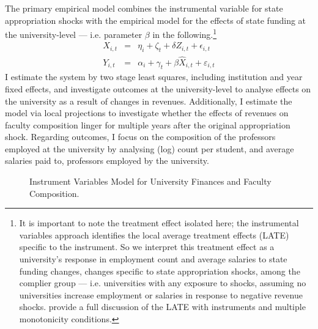 The primary empirical model combines the instrumental variable for state appropriation shocks with the empirical model for the effects of state funding at the university-level --- i.e. parameter $\beta$ in the following.\footnote{
    It is important to note the treatment effect isolated here; the instrumental variables approach identifies the local average treatment effects (LATE) specific to the instrument.
    So we interpret this treatment effect as a university's response in employment count and average salaries to state funding changes, changes specific to state appropriation shocks, among the complier group --- i.e. universities with any exposure to shocks, assuming no universities increase employment or salaries in response to negative revenue shocks.
    \cite{mogstad2021causal} provide a full discussion of the LATE with instruments and multiple monotonicity conditions.
}
\begin{eqnarray}
    \label{eqn:secondstage1}
    X_{i,t} &=& \eta_i + \zeta_t + \delta Z_{i,t} + \epsilon_{i,t} \\
    \label{eqn:secondstage2}
    Y_{i,t} &=& \alpha_i + \gamma_t + \beta \widehat X_{i,t} + \varepsilon_{i,t}
\end{eqnarray}
I estimate the system by two stage least squares, including institution and year fixed effects, and investigate outcomes at the university-level to analyse effects on the university as a result of changes in revenues.
Additionally, I estimate the model via local projections \citep{jorda2005,miller2022} to investigate whether the effects of revenues on faculty composition linger for multiple years after the original appropriation shock.
Regarding outcomes, I focus on the composition of the professors employed at the university by analysing (log) count per student, and average salaries paid to, professors employed by the university.

\begin{figure}[H]
    \centering
    \singlespacing
    \caption{Instrument Variables Model for University Finances and Faculty Composition.}
    \label{fig:SCM-ivmodel}
\end{figure}

